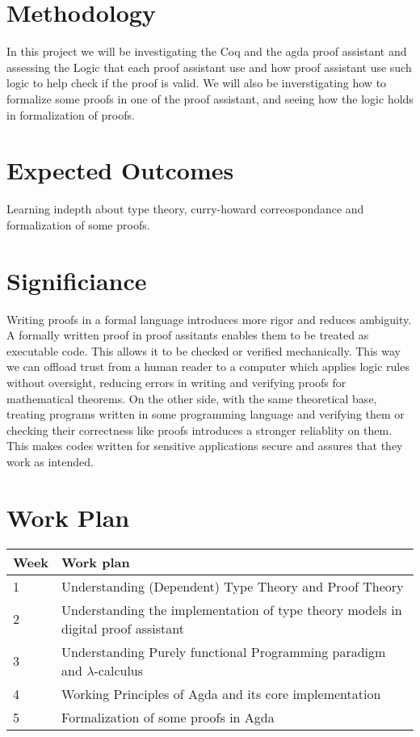 \documentclass{article}
\begin{document}
\section{Methodology}

In this project we will be investigating the  Coq and the agda proof assistant and assessing the Logic that each proof assistant use and how \the proof assistant use such logic to help check if the proof is valid.
We will also be inverstigating how to formalize some proofs in one of the proof assistant, and seeing how the logic holds in formalization of proofs. 

\section{Expected Outcomes}
Learning indepth about type theory, curry-howard correospondance and formalization of some proofs.  
\section{Significiance}
Writing proofs in a formal language introduces more rigor and reduces ambiguity. A formally written proof in proof assitants enables them to be treated as executable code. This allows it to be checked or verified mechanically. This way we can offload trust from a human reader to a computer which applies logic rules without oversight, reducing errors in writing and verifying proofs for mathematical theorems.
On the other side, with the same theoretical base, treating programs written in some programming language and verifying them or checking their correctness like proofs introduces a stronger reliablity on them. This makes codes written for sensitive applications secure and assures that they work as intended.

\section{Work Plan}
\begin{center}
    \begin{tabular}{p{1cm} p{10cm} }
        \toprule
        Week & Work plan \\
        \toprule
         1 & Understanding (Dependent) Type Theory and Proof Theory\\
        \midrule
         2 & Understanding the implementation of type theory models in digital proof assistant \\
        \midrule
         3 & Understanding Purely functional Programming paradigm and $ \lambda $-calculus\\
        \midrule
         4 & Working Principles of Agda and its core implementation \\
        \midrule 
         5 & Formalization of some proofs in Agda \\
        \bottomrule


    \end{tabular}
\end{center}
\pagebreak
\end{document}
